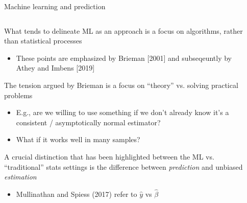 \documentclass[notes,11pt, aspectratio=169]{beamer}
\newenvironment{wideitemize}{\itemize\addtolength{\itemsep}{10pt}}{\enditemize}
\begin{document}
\begin{frame}{Machine learning and prediction}
    \begin{columns}[onlytextwidth, T] %
      \begin{column}{.9\textwidth}
        \begin{wideitemize}
        \item What tends to delineate ML as an approach is a focus on
          algorithms, rather than statistical processes
          \begin{itemize}
          \item These points are emphasized by Brieman [2001] and subseqeuntly by Athey and Imbens [2019]
          \end{itemize}
        \item The tension argued by Brieman is a focus on ``theory'' vs. solving practical problems
          \begin{itemize}
          \item E.g., are we willing to use something if we don't
            already know it's a consistent / asymptotically normal
            estimator?
          \item What if it works well in many samples?
          \end{itemize}
        \item A crucial distinction that has been highlighted between
          the ML vs. ``traditional'' stats settings is the difference
          between \emph{prediction} and unbiased \emph{estimation}
          \begin{itemize}
          \item Mullinathan and Spiess (2017) refer to $\hat{y}$  vs $\hat{\beta}$
          \end{itemize}
        \end{wideitemize}
      \end{column}%
      \hfill%
      \begin{column}{.5\textwidth}
      \end{column}%
    \end{columns}
\end{frame}
\end{document}
